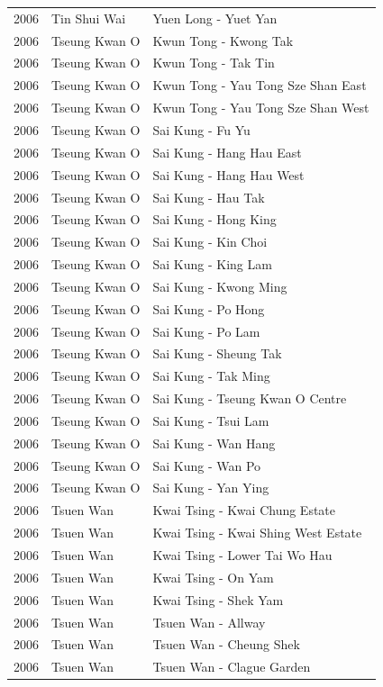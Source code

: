 \begin{longtable}{p{1.2cm}p{3cm}p{7cm}}
2006 & Tin Shui Wai & Yuen Long - Yuet Yan \\
2006 & Tseung Kwan O & Kwun Tong - Kwong Tak \\
2006 & Tseung Kwan O & Kwun Tong - Tak Tin \\
2006 & Tseung Kwan O & Kwun Tong - Yau Tong Sze Shan East \\
2006 & Tseung Kwan O & Kwun Tong - Yau Tong Sze Shan West \\
2006 & Tseung Kwan O & Sai Kung - Fu Yu \\
2006 & Tseung Kwan O & Sai Kung - Hang Hau East \\
2006 & Tseung Kwan O & Sai Kung - Hang Hau West \\
2006 & Tseung Kwan O & Sai Kung - Hau Tak \\
2006 & Tseung Kwan O & Sai Kung - Hong King \\
2006 & Tseung Kwan O & Sai Kung - Kin Choi \\
2006 & Tseung Kwan O & Sai Kung - King Lam \\
2006 & Tseung Kwan O & Sai Kung - Kwong Ming \\
2006 & Tseung Kwan O & Sai Kung - Po Hong \\
2006 & Tseung Kwan O & Sai Kung - Po Lam \\
2006 & Tseung Kwan O & Sai Kung - Sheung Tak \\
2006 & Tseung Kwan O & Sai Kung - Tak Ming \\
2006 & Tseung Kwan O & Sai Kung - Tseung Kwan O Centre \\
2006 & Tseung Kwan O & Sai Kung - Tsui Lam \\
2006 & Tseung Kwan O & Sai Kung - Wan Hang \\
2006 & Tseung Kwan O & Sai Kung - Wan Po \\
2006 & Tseung Kwan O & Sai Kung - Yan Ying \\
2006 & Tsuen Wan & Kwai Tsing - Kwai Chung Estate \\
2006 & Tsuen Wan & Kwai Tsing - Kwai Shing West Estate \\
2006 & Tsuen Wan & Kwai Tsing - Lower Tai Wo Hau \\
2006 & Tsuen Wan & Kwai Tsing - On Yam \\
2006 & Tsuen Wan & Kwai Tsing - Shek Yam \\
2006 & Tsuen Wan & Tsuen Wan - Allway \\
2006 & Tsuen Wan & Tsuen Wan - Cheung Shek \\
2006 & Tsuen Wan & Tsuen Wan - Clague Garden \\

\end{longtable}
